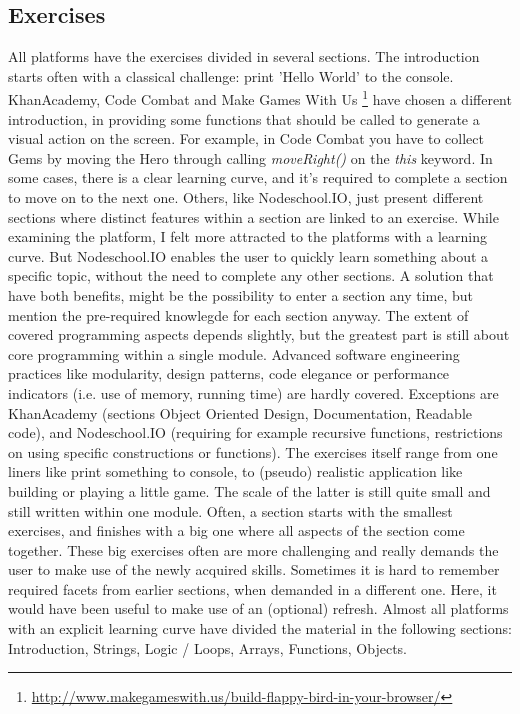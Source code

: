 \documentclass{article}
\begin{document}
\subsection{Exercises}
All platforms have the exercises divided in several sections. The introduction
starts often with a classical challenge: print 'Hello World' to the console. 
KhanAcademy, Code Combat and Make Games With Us
\footnote{\url{http://www.makegameswith.us/build-flappy-bird-in-your-browser/}}
have chosen a different introduction, in providing some functions that should be
called to generate a visual action on the screen. For example, in Code Combat 
you have to collect Gems by moving the Hero through calling {\em moveRight()} on 
the { \em this} keyword. \newline
In some cases, there is a clear learning curve, and it's required to complete a
section to move on to the next one. Others, like Nodeschool.IO, just present 
different sections where distinct features within a section are linked to an
exercise. While examining the platform, I felt more attracted to the platforms
with a learning curve. But Nodeschool.IO enables the user to quickly learn 
something about a specific topic, without the need to complete any other
sections. A solution that have both benefits, might be the possibility to 
enter a section any time, but mention the pre-required knowlegde for each
section anyway. \newline
The extent of covered programming aspects depends slightly, but the greatest 
part is still about core programming within a single module. Advanced software
engineering practices like modularity, design patterns, code elegance or 
performance indicators (i.e. use of memory, running time) are hardly covered. 
Exceptions are KhanAcademy (sections Object Oriented Design, Documentation, 
Readable code), and Nodeschool.IO (requiring for example recursive functions, 
restrictions on using specific constructions or functions). \newline
The exercises itself range from one liners like print something to console, to
(pseudo) realistic application like building or playing a little game. 
The scale of the latter is still quite small and still written within one module.
Often, a section starts with the smallest exercises, and finishes with a big 
one where all aspects of the section come together. These big exercises often 
are more challenging and really demands the user to make use of the newly 
acquired skills. Sometimes it is hard to remember required facets from earlier
sections, when demanded in a different one. Here, it would have been useful to 
make use of an (optional) refresh. Almost all platforms with an explicit
learning curve have divided the 
material in the following sections: Introduction, Strings, Logic / Loops, 
Arrays, Functions, Objects. 
\end{document}

